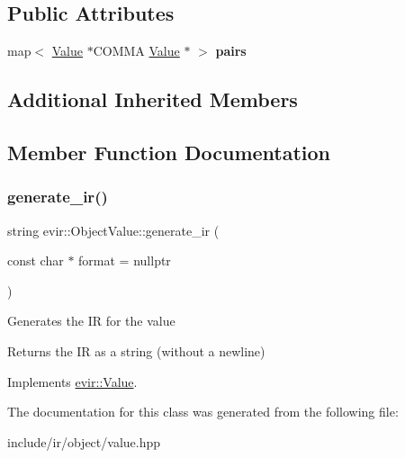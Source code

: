 \subsection*{Public Attributes}
\begin{DoxyCompactItemize}
\item 
\mbox{\label{classevir_1_1ObjectValue_ac6d2cd6efe7cbc645aa4d5bcbb16b749}} 
map$<$ \hyperlink{classevir_1_1Value}{Value} $\ast$C\+O\+M\+MA \hyperlink{classevir_1_1Value}{Value} $\ast$ $>$ {\bfseries pairs}
\end{DoxyCompactItemize}
\subsection*{Additional Inherited Members}


\subsection{Member Function Documentation}
\mbox{\label{classevir_1_1ObjectValue_a1058f47731ab800327893e388fc2b2d0}} 
\subsubsection{\texorpdfstring{generate\+\_\+ir()}{generate\_ir()}}
{\footnotesize\ttfamily string evir\+::\+Object\+Value\+::generate\+\_\+ir (\begin{DoxyParamCaption}\item[{const char $\ast$}]{format = {\ttfamily nullptr} }\end{DoxyParamCaption})\hspace{0.3cm}{\ttfamily [virtual]}}

Generates the IR for the value \begin{DoxyReturn}{Returns}
the IR as a string (without a newline) 
\end{DoxyReturn}


Implements \hyperlink{classevir_1_1Value_a3e7e5bc634fd5bba528324076fe2a763}{evir\+::\+Value}.



The documentation for this class was generated from the following file\+:\begin{DoxyCompactItemize}
\item 
include/ir/object/value.\+hpp\end{DoxyCompactItemize}
